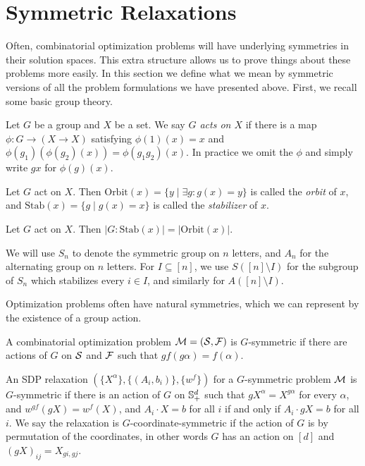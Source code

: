 \section{Symmetric Relaxations}
Often, combinatorial optimization problems will have underlying symmetries in their solution spaces. This extra structure allows us to prove things about these problems more easily. In this section we define what we mean by symmetric versions of all the problem formulations we have presented above. First, we recall some basic group theory.
\begin{definition}
Let $G$ be a group and $X$ be a set. We say \emph{$G$ acts on $X$} if there is a map $\phi: G \rightarrow (X \rightarrow X)$ satisfying $\phi(1)(x) = x$ and $\phi(g_1)(\phi(g_2)(x)) = \phi(g_1g_2)(x)$. In practice we omit the $\phi$ and simply write $gx$ for $\phi(g)(x)$.
\end{definition}
\begin{definition}
Let $G$ act on $X$. Then $\text{Orbit}(x) = \{y \mid \exists g: g(x) = y\}$ is called the \emph{orbit} of $x$, and $\text{Stab}(x) = \{g \mid g(x) = x\}$ is called the \emph{stabilizer} of $x$. 
\end{definition}
\begin{fact}
Let $G$ act on $X$. Then $|G: \text{Stab}(x)| = |\text{Orbit}(x)|$. 
\end{fact}
We will use $S_n$ to denote the symmetric group on $n$ letters, and $A_n$ for the alternating group on $n$ letters. For $I \subseteq [n]$, we use $S([n] \setminus I)$ for the subgroup of $S_n$ which stabilizes every $i \in I$, and similarly for $A([n]\setminus I)$. 

Optimization problems often have natural symmetries, which we can represent by the existence of a group action.
\begin{definition}
A combinatorial optimization problem $\mathcal M = (\mathcal S, \mathcal F)$ is $G$-symmetric if there are actions of $G$ on $\mathcal S$ and $\mathcal F$ such that $gf(g\alpha) = f(\alpha)$. 
\end{definition}

\begin{definition}
An SDP relaxation $(\{X^\alpha\},\{(A_i,b_i)\},\{w^f\})$ for a $G$-symmetric problem $\mathcal M$ is $G$-symmetric if there is an action of $G$ on $\mathbb{S}^{d}_+$ such that $gX^\alpha = X^{g\alpha}$ for every $\alpha$, and $w^{gf}(gX) = w^f(X)$, and $A_i \cdot X = b$ for all $i$ if and only if $A_i \cdot gX = b$ for all $i$. We say the relaxation is $G$-coordinate-symmetric if the action of $G$ is by permutation of the coordinates, in other words $G$ has an action on $[d]$ and $(gX)_{ij} = X_{gi,gj}$.
\end{definition}


